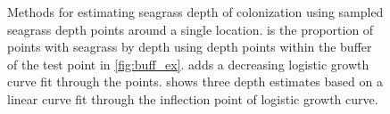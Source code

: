 \documentclass[letterpaper,12pt,oneside]{article}\usepackage[]{graphicx}\usepackage[]{color}
\begin{document}
\begin{figure}
\centering
{}


\caption{Methods for estimating seagrass depth of colonization using sampled seagrass depth points around a single location.  is the proportion of points with seagrass by depth using depth points within the buffer of the test point in \cref{fig:buff_ex}.   adds a decreasing logistic growth curve fit through the points.   shows three depth estimates based on a linear curve fit through the inflection point of logistic growth curve.}
\label{fig:est_ex}
\end{figure}
\end{document}
